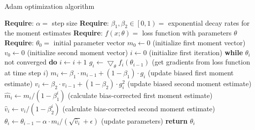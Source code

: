 \vspace{+0.6cm}
\begin{algorithm}[H]
  \centering
  \caption{Adam optimization algorithm \cite{kingma}}
  \label{alg:adam}
  \begin{algorithmic}
    \STATE \textbf{Require}: $\alpha = $ step size
    \STATE \textbf{Require}: $\beta_{1}, \beta_{2} \in \left[ 0, 1 \right) = $ exponential decay rates for the moment estimates
    \STATE \textbf{Require}: $f(x; \theta) = $ loss function with parameters $\theta$
    \STATE \textbf{Require}: $\theta_{0} = $ initial parameter vector
    \STATE $m_{0} \leftarrow 0$ (initialize first moment vector)
    \STATE $v_{0} \leftarrow 0$ (initialize second moment vector)
    \STATE $i \leftarrow 0$ (initialize first iteration)
    \STATE \textbf{while} $\theta_{i}$ not converged \textbf{do}
    \STATE \hspace{\algorithmicindent} $i \leftarrow i + 1$
    \STATE \hspace{\algorithmicindent} $g_{i} \leftarrow \bigtriangledown_{\theta} f_{i} (\theta_{i - 1})$ (get gradients from loss function at time step $i$)
    \STATE \hspace{\algorithmicindent} $m_{i} \leftarrow \beta_{1} \cdot m_{i - 1} + (1 - \beta_{1}) \cdot g_{i}$ (update biased first moment estimate)
    \STATE \hspace{\algorithmicindent} $v_{i} \leftarrow \beta_{2} \cdot v_{i - 1} + (1 - \beta_{2}) \cdot g_{i}^{2}$ (update biased second moment estimate)
    \STATE \hspace{\algorithmicindent} $\hat m_{i} \leftarrow m_{i} / (1 - \beta_{1}^{i})$ (calculate bias-corrected first moment estimate)
    \STATE \hspace{\algorithmicindent} $\hat v_{i} \leftarrow v_{i} / (1 - \beta_{2}^{i})$ (calculate bias-corrected second moment estimate)
    \STATE \hspace{\algorithmicindent} $\theta_{i} \leftarrow \theta_{i - 1} - \alpha \cdot \hat m_{i} / (\sqrt{\hat v_{i}} + \epsilon)$ (update parameters)
    \STATE \textbf{return} $\theta_{i}$
  \end{algorithmic}
\end{algorithm}
